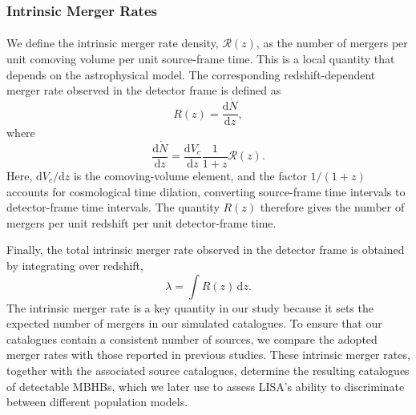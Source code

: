 \documentclass[a4paper,12pt]{article}
\begin{document}
\subsubsection{Intrinsic Merger Rates}

\paragraph{}
We define the intrinsic merger rate density, $\mathcal{R}(z)$, as the number of mergers per unit comoving volume per unit source-frame time. This is a local quantity that depends on the astrophysical model. The corresponding redshift-dependent merger rate observed in the detector frame is defined as
\begin{equation}
  R(z)
  =
  \frac{\mathrm{d}\dot{N}}{\mathrm{d}z},
  \label{eq:redshift_dept_mergerrate_1}
\end{equation}
where
\begin{equation}
  \frac{\mathrm{d}\dot{N}}{\mathrm{d}z}
  =
  \frac{\mathrm{d}V_c}{\mathrm{d}z}
  \frac{1}{1+z}
  \mathcal{R}(z).
  \label{eq:redshift_dept_mergerrate_2}
\end{equation}
Here, $\mathrm{d}V_c/\mathrm{d}z$ is the comoving-volume element, and the factor \(1/(1+z)\) accounts for cosmological time dilation, converting source-frame time intervals to detector-frame time intervals. The quantity $R(z)$ therefore gives the number of mergers per unit redshift per unit detector-frame time.

Finally, the total intrinsic merger rate observed in the detector frame is obtained by integrating over redshift,
\begin{equation}
  \lambda
  =
  \int R(z)\,\mathrm{d}z .
  \label{eq:mergerrate}
\end{equation}
The intrinsic merger rate is a key quantity in our study because it sets the expected number of mergers in our simulated catalogues. To ensure that our catalogues contain a consistent number of sources, we compare the adopted merger rates with those reported in previous studies. These intrinsic merger rates, together with the associated source catalogues, determine the resulting catalogues of detectable MBHBs, which we later use to assess LISA's ability to discriminate between different population models.
\end{document}
